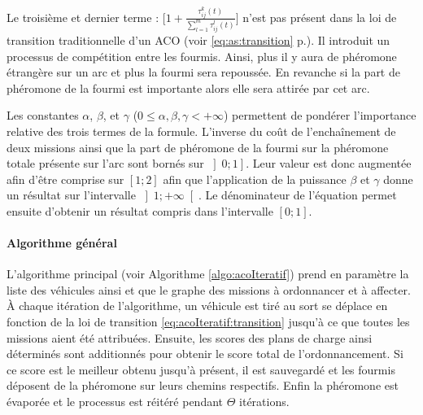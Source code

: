 Le troisième et dernier terme : $\bigg[1 +\frac{\tau^k_{ij}(t)}{\sum \limits_{l=1}^{m} \tau^l_{ij}(t)}\bigg]$ n'est pas présent dans la loi de transition traditionnelle d'un ACO (voir \ref{eq:as:transition} p.\pageref{eq:as:transition}). Il introduit un processus de compétition entre les fourmis. Ainsi, plus il y aura de phéromone étrangère sur un arc et plus la fourmi sera repoussée. En revanche si la part de phéromone de la fourmi est importante alors elle sera attirée par cet arc.

Les constantes $\alpha$, $\beta$, et $\gamma$ ($0 \leq \alpha,\beta, \gamma < + \infty$) permettent de pondérer l'importance relative des trois termes de la formule. 
L'inverse du coût de l'enchaînement de deux missions ainsi que la part de phéromone de la fourmi sur la phéromone totale présente sur l'arc sont bornés sur $\left]0;1\right]$. Leur valeur est donc augmentée afin d'être comprise sur $\left[1;2\right]$ afin que l'application de la puissance $\beta$ et $\gamma$ donne un résultat sur l'intervalle $\left]1;+\infty\right[$. 
Le dénominateur de l'équation permet ensuite d'obtenir un résultat compris dans l'intervalle $[0;1]$.

\paragraph{Algorithme général}

L'algorithme principal (voir Algorithme \ref{algo:acoIteratif}) prend en paramètre la liste des véhicules ainsi et que le graphe des missions à ordonnancer et à affecter. À chaque itération de l'algorithme, un véhicule est tiré au sort se déplace en fonction de la loi de transition \ref{eq:acoIteratif:transition} jusqu'à ce que toutes les missions aient été attribuées. Ensuite, les scores des plans de charge ainsi déterminés sont additionnés pour obtenir le score total de l'ordonnancement. Si ce score est le meilleur obtenu jusqu'à présent, il est sauvegardé et les fourmis déposent de la phéromone sur leurs chemins respectifs. Enfin la phéromone est évaporée et le processus est réitéré pendant $\Theta$ itérations.

